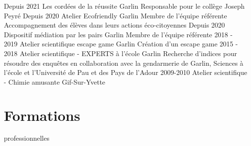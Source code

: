 \documentclass{cv-style-cec}
\begin{document}
\begin{entrylist}
\entry
{Depuis 2021}
{Les cordées de la réussite}
{Garlin}
{Responsable pour le collège Joseph Peyré}
\entry
{Depuis 2020}
{Atelier Ecofriendly}
{Garlin}
{Membre de l'équipe référente\\ Accompagnement des élèves dans leurs actions éco-citoyennes}
\entry
{Depuis 2020}
{Dispositif médiation par les pairs}
{Garlin}
{Membre de l'équipe référente}
\entry
{2018 - 2019}
{Atelier scientifique escape game}
{Garlin}
{Création d'un escape game}
\entry
{2015 - 2018}
{Atelier scientifique - EXPERTS à l'école}
{Garlin}
{Recherche d'indices pour résoudre des enquêtes en collaboration avec la 
gendarmerie de Garlin, Sciences à l'école et l'Université de Pau et des Pays 
de l'Adour}
\entry
{2009-2010}
{Atelier scientifique - Chimie amusante}
{Gif-Sur-Yvette}
{}
\end{entrylist}

\section{Formations}{ professionnelles}
\end{document}
